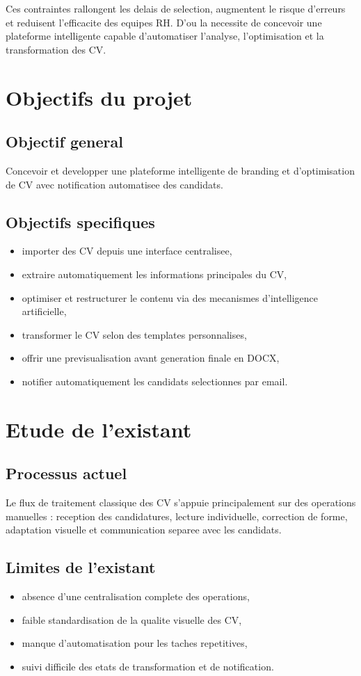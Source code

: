 Ces contraintes rallongent les delais de selection, augmentent le risque d'erreurs et reduisent l'efficacite des equipes RH. D'ou la necessite de concevoir une plateforme intelligente capable d'automatiser l'analyse, l'optimisation et la transformation des CV.

\section{Objectifs du projet}
\subsection{Objectif general}
Concevoir et developper une plateforme intelligente de branding et d'optimisation de CV avec notification automatisee des candidats.

\subsection{Objectifs specifiques}
\begin{itemize}[label=--]
    \item importer des CV depuis une interface centralisee,
    \item extraire automatiquement les informations principales du CV,
    \item optimiser et restructurer le contenu via des mecanismes d'intelligence artificielle,
    \item transformer le CV selon des templates personnalises,
    \item offrir une previsualisation avant generation finale en DOCX,
    \item notifier automatiquement les candidats selectionnes par email.
\end{itemize}

\section{Etude de l'existant}
\subsection{Processus actuel}
Le flux de traitement classique des CV s'appuie principalement sur des operations manuelles : reception des candidatures, lecture individuelle, correction de forme, adaptation visuelle et communication separee avec les candidats.

\subsection{Limites de l'existant}
\begin{itemize}[label=--]
    \item absence d'une centralisation complete des operations,
    \item faible standardisation de la qualite visuelle des CV,
    \item manque d'automatisation pour les taches repetitives,
    \item suivi difficile des etats de transformation et de notification.
\end{itemize}

